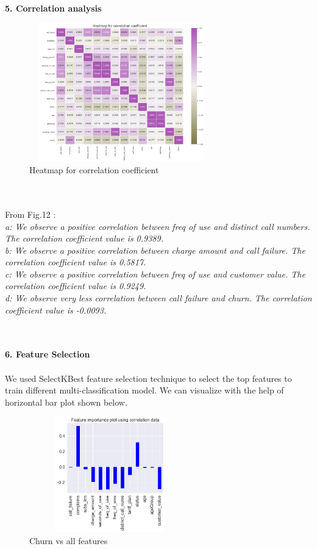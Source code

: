 \documentclass[a4paper, 10pt, conference]{ieeeconf}      %
\begin{document}
\\\
\\\textbf{5. Correlation analysis}

\begin{figure}[htp]
    \centering
    \includegraphics[width=8cm,height=6cm]{Images/heatmap.png}
    \caption{Heatmap for correlation coefficient}
    \label{fig:heatmap}
\end{figure}
\\\
\\From Fig.12 :
\\\textit{a: We observe a  positive correlation between freq of use and distinct call numbers. The correlation coefficient value is 0.9389.
\\b: We observe a  positive correlation between charge amount and call failure. The correlation coefficient value is 0.5817.
\\c: We observe a  positive correlation between freq of use and customer value. The correlation coefficient value is 0.9249.
\\d: We observe very less correlation between call failure and churn. The correlation coefficient value is -0.0093.}
\\\

\\\textbf{6. Feature Selection}
\\
\\We used SelectKBest feature selection technique to select the top features to train different multi-classification model. We can visualize with the help of horizontal bar plot shown below.
\begin{figure}[htp]
    \centering
    \includegraphics[width=7cm,height=5cm]{Images/featureImportance.png}
    \caption{Churn vs all features}
    \label{fig:featureImportance}
\end{figure}
\end{document}
